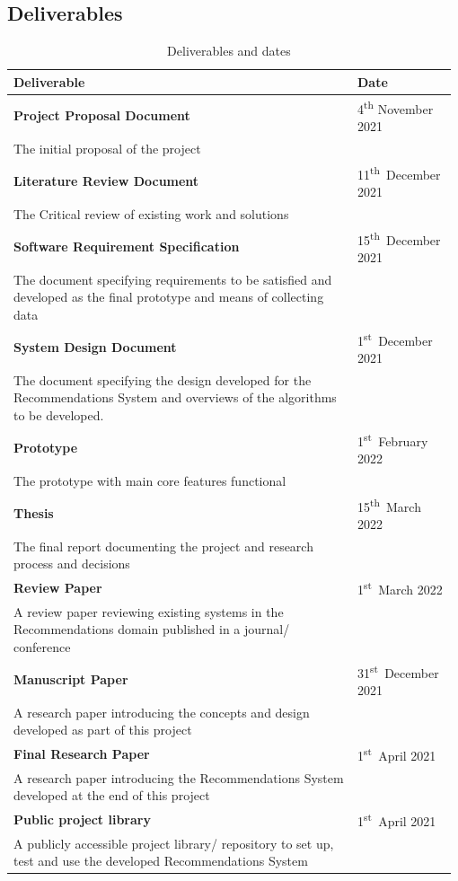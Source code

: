 \documentclass[a4paper, 12pt, oneside]{report}
\begin{document}
\newpage
\subsection{Deliverables}

\begin{longtable}{| p{0.76\linewidth} | p{0.22\linewidth}|}
\caption{Deliverables and dates}
\label{tab:deliverables-table}\\
\hline
Deliverable &   Date  \\ 
\hline
\textbf{Project Proposal Document}    &   4\textsuperscript{th} November 2021\\
The initial proposal of the project  &  \\ 
\hline
\textbf{Literature Review Document} & 11\textsuperscript{th}~December 2021  \\ 
The Critical review of existing work and solutions  & \\ 
\hline
\textbf{Software Requirement Specification} & 15\textsuperscript{th}~December 2021 \\ 
The document specifying requirements to be satisfied and developed as the final prototype and means of collecting data &    \\ 
\hline
\textbf{System Design Document} & 1\textsuperscript{st}~December 2021  \\ 
The document specifying the design developed for the Recommendations System and overviews of the algorithms to be developed.    &   \\ 
\hline
\textbf{Prototype}  & 1\textsuperscript{st}~February 2022   \\
The prototype with main core features functional    &    \\ \hline
\textbf{Thesis} & 15\textsuperscript{th}~March 2022  \\  The final report documenting the project and research process and decisions          &   \\ 
\hline
\textbf{Review Paper}  &  1\textsuperscript{st}~March 2022     \\ 
A review paper reviewing existing systems in the Recommendations domain published in a journal/ conference    &   \\ 
\hline
\textbf{Manuscript Paper}   &  31\textsuperscript{st}~December 2021 \\ 
A research paper introducing the concepts and design developed as part of this project &   \\ 
\hline
\textbf{Final Research Paper}   &   1\textsuperscript{st}~April 2021    \\ 
A research paper introducing the Recommendations System developed at the end of this project    &    \\ 
\hline
\textbf{Public project library}   &   1\textsuperscript{st}~April 2021 \\ 
A publicly accessible project library/ repository to set up, test and use the developed Recommendations System  &   \\
\hline
\end{longtable}
\end{document}
